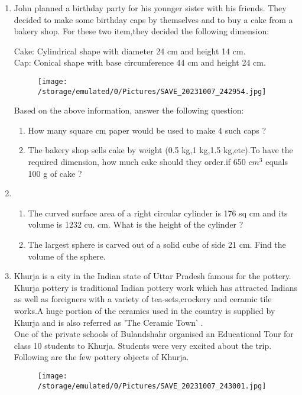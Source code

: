 \documentclass[12pt]{article}
\begin{document}
\begin{enumerate}
            \item John planned a birthday party for his younger sister with his friends. They decided to make some birthday caps by themselves and to buy a cake from a bakery shop. For these two item,they decided the following dimension:
           
            Cake: Cylindrical shape with diameter 24 cm and height 14 cm.\\
            Cap: Conical shape with base circumference 44 cm and height 24 cm.\\
           \begin{figure}[H]
                \centering
                \texttt{[image: /storage/emulated/0/Pictures/SAVE\_20231007\_242954.jpg]}
                \caption{}
                \label{SAVE_20231007_242954}
            \end{figure}
             Based on the above information, answer the following question:
       \begin{enumerate}
          \item How many square cm paper would be used to make 4 such caps ?
          \item  The bakery shop sells cake by weight (0.5 kg,1 kg,1.5 kg,etc).To have the required dimension, how much cake should they order.if 650 $cm^3$  equals 100 g of cake ?
            \end{enumerate}
              \item \begin{enumerate}
          \item The curved surface area of a right circular cylinder is 176 sq cm and its volume is 1232 cu. cm. What is the  height of the cylinder ?
             
         \item The largest sphere is carved out of a solid cube of side 21 cm. Find the volume of the sphere.
        \end{enumerate}
       
         
        \item Khurja is a city in the Indian state of Uttar Pradesh famous for the pottery. Khurja pottery is traditional Indian pottery work which has attracted Indians as well as foreigners with a variety of tea-sets,crockery and ceramic tile works.A huge portion of the ceramics used in the country is supplied by Khurja and is also referred as 'The Ceramic Town' .\\

        One of the private schools of Bulandshahr organised an Educational Tour for class 10 students to Khurja. Students were very excited about the trip. Following  are the few pottery objects of Khurja.
       \begin{figure}[H]
            \centering
              \texttt{[image: /storage/emulated/0/Pictures/SAVE\_20231007\_243001.jpg]}
            \caption{}
            \label{SAVE_20231007_243001}
        \end{figure}
       

\end{enumerate}
\end{document}
